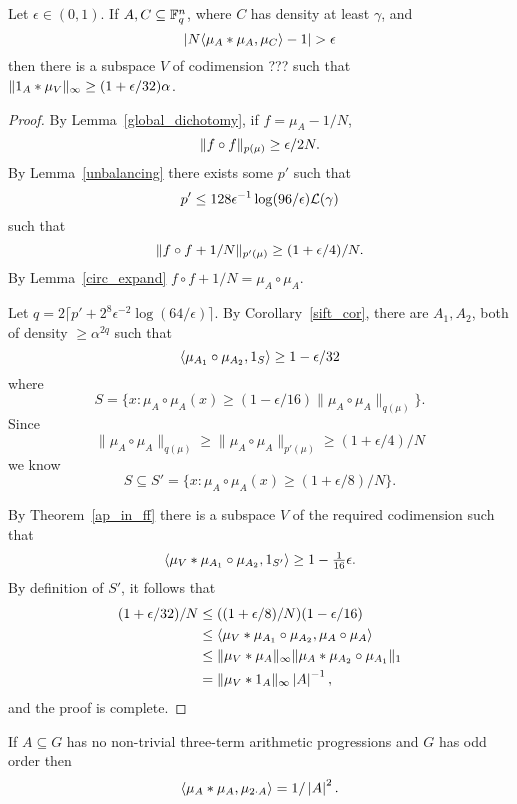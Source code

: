 \begin{proposition}\label{di_in_ff}
Let $\epsilon \in (0,1)$. If $A,C\subseteq \mathbb{F}_q^n$, where $C$ has density at least $\gamma$, and
\[\left\lvert N\langle \mu_A\ast \mu_A,\mu_C\rangle -1\right\rvert> \epsilon\]
then there is a subspace $V$ of codimension ???
such that $\lVert 1_{A}\ast \mu_V\rVert_\infty \geq (1+\epsilon/32)\alpha$.
\end{proposition}
\begin{proof}
By Lemma~\ref{global_dichotomy}, if $f=\mu_A-1/N$,
\[\lVert f\circ f\rVert_{p(\mu)}\geq \epsilon /2N.\]
By Lemma~\ref{unbalancing} there exists some $p'$ such that
\[p'\leq 128\epsilon^{-1}\log(96/\epsilon)\mathcal{L}{(}\gamma)\]
such that
\[\lVert f\circ f+1/N\rVert_{p'(\mu)}\geq (1+\epsilon/4)/N.\]
By Lemma~\ref{circ_expand} $f\circ f+1/N=\mu_A\circ \mu_A$.

Let $q=2\lceil p'+2^8\epsilon^{-2}\log(64/\epsilon)\rceil$. By Corollary~\ref{sift_cor}, there are $A_1,A_2$, both of density $\geq \alpha^{2q}$ such that
\[\langle \mu_{A_1}\circ \mu_{A_2},1_{S}\rangle \geq 1-\epsilon/32\]
where
\[S=\{x : \mu_A\circ \mu_A(x)\geq (1-\epsilon/16)\| \mu_A\circ \mu_A\|_{q(\mu)}\}.\]
Since
\[\| \mu_A\circ \mu_A\|_{q(\mu)}\geq \| \mu_A\circ \mu_A\|_{p'(\mu)}\geq (1+\epsilon/4)/N\]
we know
\[S\subseteq S'=\{x : \mu_A\circ \mu_A(x)\geq (1+\epsilon/8)/N\}.\]

By Theorem~\ref{ap_in_ff} there is a subspace $V$ of the required codimension such that
\[\langle \mu_V\ast \mu_{A_1}\circ \mu_{A_2},1_{S'}\rangle \geq 1-\tfrac{1}{16}\epsilon.\]
By definition of $S'$, it follows that
\begin{align*}
(1+\epsilon/32)/N
&\leq ((1+\epsilon/8)/N)(1-\epsilon/16)\\
&\leq \langle \mu_V\ast \mu_{A_1}\circ \mu_{A_2},\mu_A\circ \mu_A\rangle\\
&\leq \lVert \mu_V\ast \mu_A\rVert_\infty \lVert \mu_{A}\ast \mu_{A_2}\circ \mu_{A_1}\rVert_1\\
&= \lVert \mu_V\ast 1_{A}\rVert_\infty\left\lvert A\right\rvert^{-1},
\end{align*}
and the proof is complete.
\end{proof}


\begin{lemma}
\label{no3aps_inner_prod}
\leanok
If $A\subseteq G$ has no non-trivial three-term arithmetic progressions and $G$ has odd order then
\[\langle \mu_A\ast \mu_A,\mu_{2\cdot A}\rangle = 1/\left\lvert A\right\rvert^2.\]
\end{lemma}

